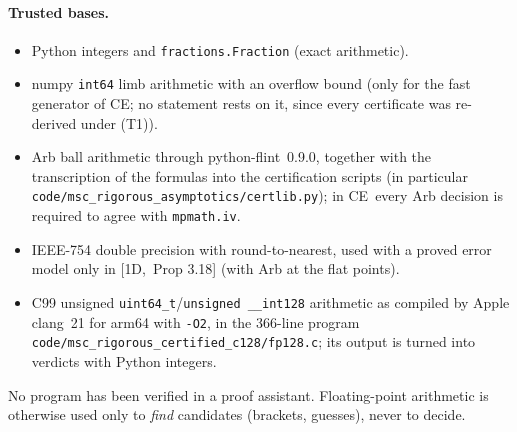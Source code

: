 \documentclass[10pt,a4paper]{article}
\theoremstyle{plain}
\theoremstyle{definition}
\newcommand{\src}[2]{[\textsf{#1},~#2]}           %
\newcommand{\ONE}{\textsf{1D}}
\newcommand{\CER}{\textsf{CE}}
\begin{document}
\paragraph{Trusted bases.}
\begin{itemize}
\item[(T1)] Python integers and \texttt{fractions.Fraction} (exact arithmetic).
\item[(T2)] numpy \texttt{int64} limb arithmetic with an overflow bound (only for the fast generator of \CER; no statement rests on it, since every certificate was re-derived under (T1)).
\item[(T3)] Arb ball arithmetic through python-flint~0.9.0, together with the transcription of the formulas into the certification scripts (in particular \texttt{code/msc\_rigorous\_asymptotics/certlib.py}); in \CER\ every Arb decision is required to agree with \texttt{mpmath.iv}.
\item[(T4)] IEEE-754 double precision with round-to-nearest, used with a proved error model only in \src{\ONE}{Prop 3.18} (with Arb at the flat points).
\item[(T5)] C99 unsigned \texttt{uint64\_t}/\texttt{unsigned \_\_int128} arithmetic as compiled by Apple clang~21 for arm64 with \texttt{-O2}, in the 366-line program \texttt{code/msc\_rigorous\_certified\_c128/fp128.c}; its output is turned into verdicts with Python integers.
\end{itemize}
No program has been verified in a proof assistant. Floating-point arithmetic is otherwise used only to \emph{find} candidates (brackets, guesses), never to decide.
\end{document}
